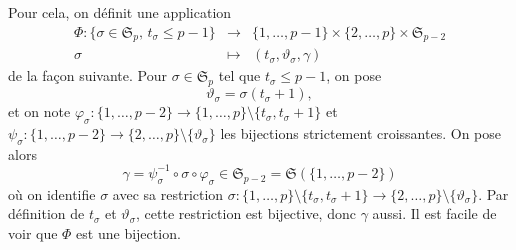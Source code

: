 \documentclass[12pt,francais, reqno]{smfart}
\numberwithin{equation}{section}
\newcommand{\moins}{\setminus}
\newcommand{\spp}{{\mathfrak S}_p}
\newcommand{\sppmd}{{\mathfrak S}_{p-2}}
\newcommand{\unp}{\{1,\ldots, p\}}
\newcommand{\unpmu}{\{1,\ldots, p-1\}}
\newcommand{\unpmd}{\{1,\ldots, p-2\}}
\newcommand{\deuxp}{\{2,\ldots, p\}}
\newcommand{\tsig}{t_{\sigma}}
\newcommand{\tetasig}{\teta_{\sigma}}
\newcommand{\teta}{\vartheta}
\newcommand{\phisig}{\phii_{\sigma}}
\newcommand{\phii}{\varphi}
\newcommand{\psisig}{\psii_{\sigma}}
\newcommand{\psii}{\psi}
\begin{document}
\bigskip

Pour cela, on d\'efinit une application
\begin{eqnarray*}
\Phi : \{ \sigma \in \spp, \, \tsig \leq p-1 \} 
&\rightarrow & \unpmu \times \deuxp  \times \sppmd \\
\sigma &\mapsto& (\tsig, \tetasig, \gamma)
\end{eqnarray*}
de la fa\c con suivante. Pour $\sigma \in \spp$ tel que $\tsig \leq p-1$, on pose
$$\tetasig = \sigma(\tsig+1), $$
et on note $\phisig : \unpmd \rightarrow \unp \moins \{ \tsig, \tsig+1\}$ et 
$\psisig : \unpmd \rightarrow \deuxp \moins \{ \tetasig\}$ les bijections strictement croissantes. On pose alors
$$\gamma = \psisig^{-1} \circ \sigma \circ \phisig \in \sppmd = {\mathfrak S} (\unpmd)$$
o\`u on identifie $\sigma$ avec sa restriction $\sigma : \unp \moins \{ \tsig, \tsig+1\} \rightarrow \deuxp \moins \{ \tetasig\}$. Par d\'efinition de $\tsig$ et $\tetasig$, cette restriction est bijective, donc $\gamma$ aussi. Il est facile de voir que $\Phi$ est une bijection. 

\bigskip
\end{document}
